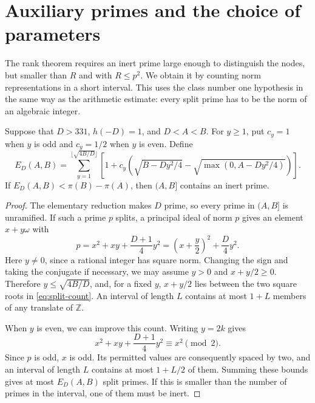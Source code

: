\section{Auxiliary primes and the choice of parameters}\label{sec:primes}
The rank theorem requires an inert prime large enough to distinguish the
nodes, but smaller than $R$ and with $R\leq p^2$. We obtain it by counting
norm representations in a short interval. This uses the class number one
hypothesis in the same way as the arithmetic estimate: every split prime
has to be the norm of an algebraic integer.

\begin{lemma}\label{lem:prime-window}
Suppose that $D>331$, $h(-D)=1$, and $D<A<B$. For $y\geq1$, put
$c_y=1$ when $y$ is odd and $c_y=1/2$ when $y$ is even. Define
\begin{equation}\label{eq:split-count}
 E_D(A,B)=\sum_{y=1}^{\lfloor\sqrt{4B/D}\rfloor}
 \left[1+c_y\left(\sqrt{B-Dy^2/4}
              -\sqrt{\max(0,A-Dy^2/4)}\right)\right].
\end{equation}
If $E_D(A,B)<\pi(B)-\pi(A)$, then $(A,B]$ contains an inert prime.
\end{lemma}
\begin{proof}
The elementary reduction makes $D$ prime, so every prime in $(A,B]$ is
unramified. If such a prime $p$ splits, a principal ideal of norm $p$
gives an element $x+y\omega$ with
\[
 p=x^2+xy+\frac{D+1}{4}y^2
   =\left(x+\frac y2\right)^2+\frac D4y^2.
\]
Here $y\ne0$, since a rational integer has square norm. Changing the sign
and taking the conjugate if necessary, we may assume $y>0$ and
$x+y/2\geq0$. Therefore $y\leq\sqrt{4B/D}$, and, for a fixed $y$,
$x+y/2$ lies between the two square roots in \eqref{eq:split-count}.
An interval of length $L$ contains at most $1+L$ members of any translate
of $\mathbb Z$.

When $y$ is even, we can improve this count. Writing $y=2k$ gives
\[
 x^2+xy+\frac{D+1}{4}y^2\equiv x^2\pmod2.
\]
Since $p$ is odd, $x$ is odd. Its permitted values are consequently spaced
by two, and an interval of length $L$ contains at most $1+L/2$ of them.
Summing these bounds gives at most $E_D(A,B)$ split primes. If this is
smaller than the number of primes in the interval, one of them must be inert.
\end{proof}

